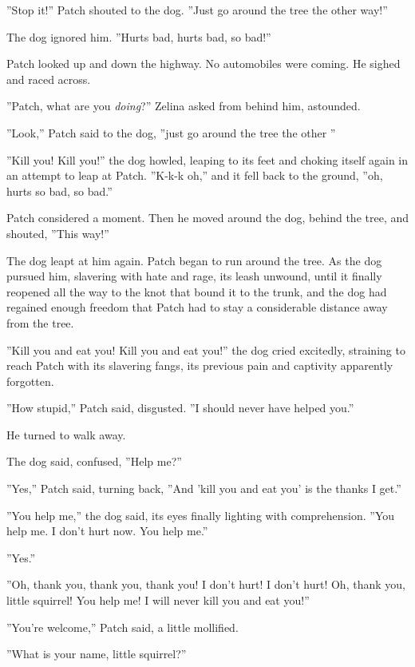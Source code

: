 \documentclass[11pt]{article}
\begin{document}
 ''Stop it!'' Patch shouted to the dog. ''Just go around the tree the other way!''\par
 The dog ignored him. ''Hurts bad, hurts bad, so bad!''\par
 Patch looked up and down the highway. No automobiles were coming. He sighed and raced across.\par
 ''Patch, what are you {\it doing}?'' Zelina asked from behind him, astounded.\par
 ''Look,'' Patch said to the dog, ''just go around the tree the other %
''\par
 ''Kill you! Kill you!'' the dog howled, leaping to its feet and choking itself again in an attempt to leap at Patch. ''K-k-k%
oh,'' and it fell back to the ground, ''oh, hurts so bad, so bad.''\par
 Patch considered a moment. Then he moved around the dog, behind the tree, and shouted, ''This way!''\par
 The dog leapt at him again. Patch began to run around the tree. As the dog pursued him, slavering with hate and rage, its leash unwound, until it finally reopened all the way to the knot that bound it to the trunk, and the dog had regained enough freedom that Patch had to stay a considerable distance away from the tree.\par
 ''Kill you and eat you! Kill you and eat you!'' the dog cried excitedly, straining to reach Patch with its slavering fangs, its previous pain and captivity apparently forgotten.\par
 ''How stupid,'' Patch said, disgusted. ''I should never have helped you.''\par
 He turned to walk away.\par
 The dog said, confused, ''Help me?''\par
 ''Yes,'' Patch said, turning back, ''And 'kill you and eat you' is the thanks I get.''\par
 ''You help me,'' the dog said, its eyes finally lighting with comprehension. ''You help me. I don't hurt now. You help me.''\par
 ''Yes.''\par
 ''Oh, thank you, thank you, thank you! I don't hurt! I don't hurt! Oh, thank you, little squirrel! You help me! I will never kill you and eat you!''\par
 ''You're welcome,'' Patch said, a little mollified.\par
 ''What is your name, little squirrel?''\par
\end{document}
